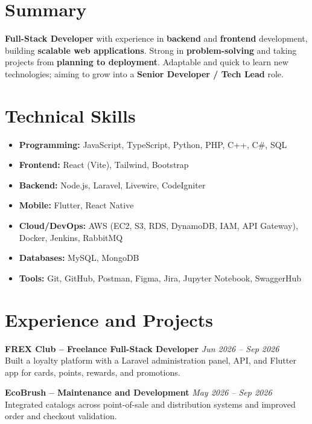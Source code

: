 \section{Summary}
\textbf{Full-Stack Developer} with experience in \textbf{backend} and \textbf{frontend} development, building \textbf{scalable web applications}. Strong in \textbf{problem-solving} and taking projects from \textbf{planning to deployment}. Adaptable and quick to learn new technologies; aiming to grow into a \textbf{Senior Developer / Tech Lead} role.

\section{Technical Skills}
\begin{itemize}
    \item \textbf{Programming:} JavaScript, TypeScript, Python, PHP, C++, C\#, SQL
    \item \textbf{Frontend:} React (Vite), Tailwind, Bootstrap
    \item \textbf{Backend:} Node.js, Laravel, Livewire, CodeIgniter
    \item \textbf{Mobile:} Flutter, React Native
    \item \textbf{Cloud/DevOps:} AWS (EC2, S3, RDS, DynamoDB, IAM, API Gateway), Docker, Jenkins, RabbitMQ
    \item \textbf{Databases:} MySQL, MongoDB
    \item \textbf{Tools:} Git, GitHub, Postman, Figma, Jira, Jupyter Notebook, SwaggerHub
\end{itemize}

\section{Experience and Projects}
\textbf{FREX Club -- Freelance Full-Stack Developer} \hfill \textit{Jun 2026 -- Sep 2026}\\
Built a loyalty platform with a Laravel administration panel, API, and Flutter app for cards, points, rewards, and promotions.

\textbf{EcoBrush -- Maintenance and Development} \hfill \textit{May 2026 -- Sep 2026}\\
Integrated catalogs across point-of-sale and distribution systems and improved order and checkout validation.

